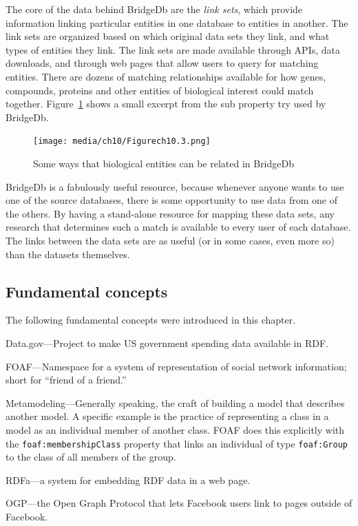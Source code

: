 The core of the data behind BridgeDb are the \emph{link sets}, which provide information linking
particular entities in one database to entities in another.  The link sets are organized based on 
which original data sets they link, and what types of entities they link.  The link sets are made available 
through APIs, data downloads, and through web pages that allow users to query for matching 
entities.  There are dozens of matching relationships available for how genes, compounds, proteins and 
other entities of biological interest could match together.  Figure~\ref{Fig:ch10.3} shows a small excerpt
from the sub property try used by BridgeDb. 

\begin{figure}
    \centering
    \texttt{[image: media/ch10/Figurech10.3.png]}
    \caption{Some ways that biological entities can be related in BridgeDb}
    \label{Fig:ch10.3}
\end{figure}

BridgeDb is a fabulously useful resource, because whenever anyone wants to use one of the
source databases, there is some opportunity to use data from one of the others.  By having a 
stand-alone resource for mapping these data sets, any research that determines such 
a match is available to every user of each database.  The links between the data sets are 
as useful (or in some cases, even more so) than the datasets themselves. 




\subsection{Fundamental concepts}

The following fundamental concepts were introduced in this chapter.

Data.gov---Project to make US government spending data available in RDF.

FOAF---Namespace for a system of representation of social network
information; short for ``friend of a friend.''

Metamodeling---Generally speaking, the craft of building a model that
describes another model. A specific example is the practice of
representing a class in a model as an individual member of another
class. FOAF does this explicitly with the \texttt{foaf:membershipClass} property
that links an individual of type \texttt{foaf:Group} to the class of all members
of the group.

RDFa---a system for embedding RDF data in a web page.

OGP---the Open Graph Protocol that lets Facebook users link to pages
outside of Facebook.
